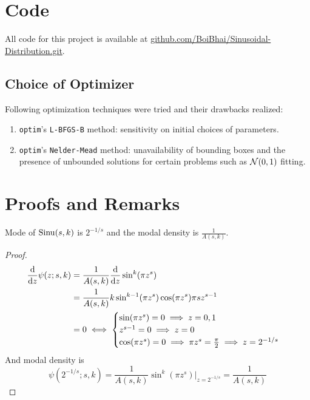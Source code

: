 \appendix

\chapter{Code}
All code for this project is available at \hyperlink{github.com/BoiBhai/Sinusoidal-Distribution.git}{github.com/BoiBhai/Sinusoidal-Distribution.git}.

\section{Choice of Optimizer}
Following optimization techniques were tried and their drawbacks realized:
\begin{enumerate}
    \item \texttt{optim}'s \texttt{L-BFGS-B} method: sensitivity on initial choices of parameters.
    \item \texttt{optim}'s \texttt{Nelder-Mead} method: unavailability of bounding boxes and the presence of unbounded solutions for certain problems such as $\mathcal{N} (0,1)$ fitting.
\end{enumerate}


\chapter{Proofs and Remarks}
\begin{thm}\label{thm:mode}
        Mode of $\operatorname*{Sinu} (s,k)$ is $2^{-1/s}$ and the modal density is $\frac{1}{A(s,k)}$.
        \end{thm}
\begin{proof}
	\begin{align*}
		\frac{\mathrm d}{\mathrm d z} \psi(z; s,k) &= \frac{1}{A(s,k)} \frac{\mathrm d}{\mathrm d z} \sin^k(\pi z^s)\\
		&= \frac{1}{A(s,k)} k \sin^{k-1}(\pi z^s) \cos(\pi z^s) \pi s z^{s-1}\\
		&= 0 \iff \begin{cases}
			\sin(\pi z^s) =0 \implies z=0,1\\
			z^{s-1} = 0 \implies z=0\\
			\cos(\pi z^s) = 0 \implies \pi z^s = \frac{\pi}{2} \implies z = 2^{-1/s}
		\end{cases}
	\end{align*}
	And modal density is \[\psi(2^{-1/s}; s,k) = \frac{1}{A(s,k)} \sin^k(\pi z^s)\bigg|_{z=2^{-1/s}} = \frac{1}{A(s,k)}\]
\end{proof}


